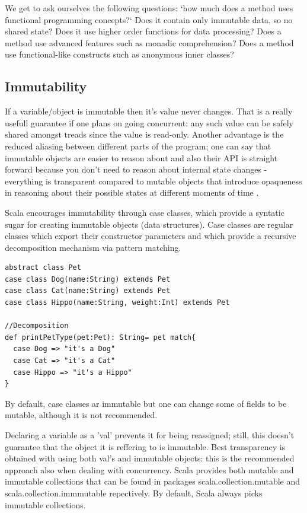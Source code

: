 \documentclass{article}
\begin{document}
We get to ask ourselves the following questions: `how much does a method uses functional programming concepts?` Does it contain only immutable data, so no shared state? Does it use higher order functions for data processing? Does a method use advanced features such as monadic comprehension? Does a method use functional-like constructs such as anonymous inner classes? \par

\subsection {Immutability}
If a variable/object is immutable then it's value never changes. That is a really usefull guarantee if one plans on going concurrent: any such value can be safely shared amongst treads since the value is read-only. Another advantage is the reduced aliasing between different parts of the program; one can say that immutable objects are easier to reason about and also their API is straight forward because you don't need to reason about internal state changes - everything is transparent compared to mutable objects that introduce opaqueness in reasoning about their possible states at different moments of time . \par
Scala encourages immutability through case classes, which provide a syntatic sugar for creating immutable objects (data structures). Case classes are regular classes which export their constructor parameters and which provide a recursive decomposition mechanism via pattern matching.

\begin{lstlisting} 
abstract class Pet
case class Dog(name:String) extends Pet 
case class Cat(name:String) extends Pet
case class Hippo(name:String, weight:Int) extends Pet

//Decomposition
def printPetType(pet:Pet): String= pet match{
  case Dog => "it's a Dog"
  case Cat => "it's a Cat"
  case Hippo => "it's a Hippo"
}
\end{lstlisting}

By default, case classes ar immutable but one can change some of fields to be mutable, although it is not recommended.\par

Declaring a variable as a 'val' prevents it for being reassigned; still, this doesn't guarantee that the object it is reffering to is immutable. Best transparency is obtained with using both val's and immutable objects: this is the recommended approach also when dealing with concurrency. Scala provides both mutable and immutable collections that can be found in packages scala.collection.mutable and scala.collection.immmutable repectively. By default, Scala always picks immutable collections. 
\end{document}
